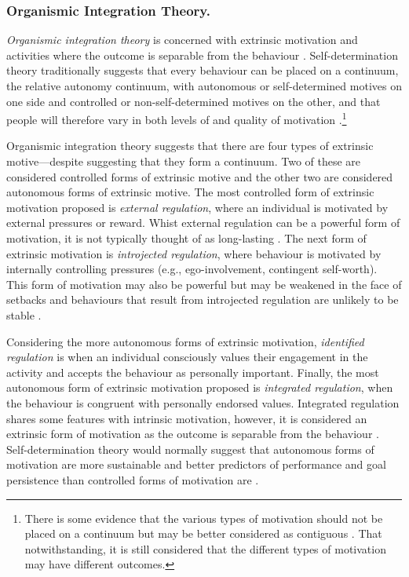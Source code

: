 \documentclass[
  12pt,
  a4paper,
]{book}
\begin{document}
\hypertarget{organismic-integration-theory.}{%
\subsubsection{Organismic Integration Theory.}\label{organismic-integration-theory.}}

\emph{Organismic integration theory} is concerned with extrinsic motivation and activities where the outcome is separable from the behaviour \citep{Ryan1985}. Self-determination theory traditionally suggests that every behaviour can be placed on a continuum, the relative autonomy continuum, with autonomous or self-determined motives on one side and controlled or non-self-determined motives on the other, and that people will therefore vary in both levels of and quality of motivation \citep{Deci1985b, Sheldon2019}.\footnote{There is some evidence that the various types of motivation should not be placed on a continuum but may be better considered as contiguous \citep{Chemolli2014}. That notwithstanding, it is still considered that the different types of motivation may have different outcomes.}

Organismic integration theory suggests that there are four types of extrinsic motive---despite suggesting that they form a continuum. Two of these are considered controlled forms of extrinsic motive and the other two are considered autonomous forms of extrinsic motive. The most controlled form of extrinsic motivation proposed is \emph{external regulation}, where an individual is motivated by external pressures or reward. Whist external regulation can be a powerful form of motivation, it is not typically thought of as long-lasting \citep{Ryan2000c}. The next form of extrinsic motivation is \emph{introjected regulation}, where behaviour is motivated by internally controlling pressures (e.g., ego-involvement, contingent self-worth). This form of motivation may also be powerful but may be weakened in the face of setbacks and behaviours that result from introjected regulation are unlikely to be stable \citep{Deci1995, Ryan2019}.

Considering the more autonomous forms of extrinsic motivation, \emph{identified regulation} is when an individual consciously values their engagement in the activity and accepts the behaviour as personally important. Finally, the most autonomous form of extrinsic motivation proposed is \emph{integrated regulation}, when the behaviour is congruent with personally endorsed values. Integrated regulation shares some features with intrinsic motivation, however, it is considered an extrinsic form of motivation as the outcome is separable from the behaviour \citep{Ryan2002}. Self-determination theory would normally suggest that autonomous forms of motivation are more sustainable and better predictors of performance and goal persistence than controlled forms of motivation are \citep{Hagger2015, Pelletier2001, Ryan2019}.
\end{document}
